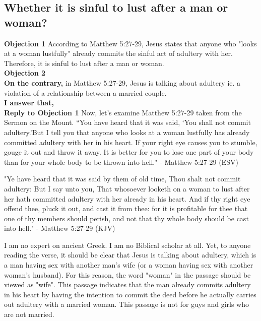 \documentclass[a4paper, parskip=full, 12pt]{article}
\begin{document}
\subsection{Whether it is sinful to lust after a man or woman?}
\textbf{Objection 1} According to Matthew 5:27-29, Jesus states that anyone who "looks at a woman lustfully" already commits the sinful act of adultery with her. Therefore, it is sinful to lust after a man or woman. \\
\textbf{Objection 2} \\
\textbf{On the contrary,} in Matthew 5:27-29, Jesus is talking about adultery ie. a violation of a relationship between a married couple.\\
\textbf{I answer that,} \\
\textbf{Reply to Objection 1} Now, let's examine Matthew 5:27-29 taken from the Sermon on the Mount.
“You have heard that it was said, ‘You shall not commit adultery.’But I tell you that anyone who looks at a woman lustfully has already committed adultery with her in his heart. If your right eye causes you to stumble, gouge it out and throw it away. It is better for you to lose one part of your body than for your whole body to be thrown into hell." - Matthew 5:27-29 (ESV)

"Ye have heard that it was said by them of old time, Thou shalt not commit adultery: But I say unto you, That whosoever looketh on a woman to lust after her hath committed adultery with her already in his heart. And if thy right eye offend thee, pluck it out, and cast it from thee: for it is profitable for thee that one of thy members should perish, and not that thy whole body should be cast into hell." - Matthew 5:27-29 (KJV)

I am no expert on ancient Greek. I am no Biblical scholar at all. Yet, to anyone reading the verse, it should be clear that Jesus is talking about adultery, which is a man having sex with another man's wife (or a woman having sex with another woman's husband). For this reason, the word "woman" in the passage should be viewed as "wife". This passage indicates that the man already commits adultery in his heart by having the intention to commit the deed before he actually carries out adultery with a married woman. This passage is not for guys and girls who are not married. \\
\end{document}
